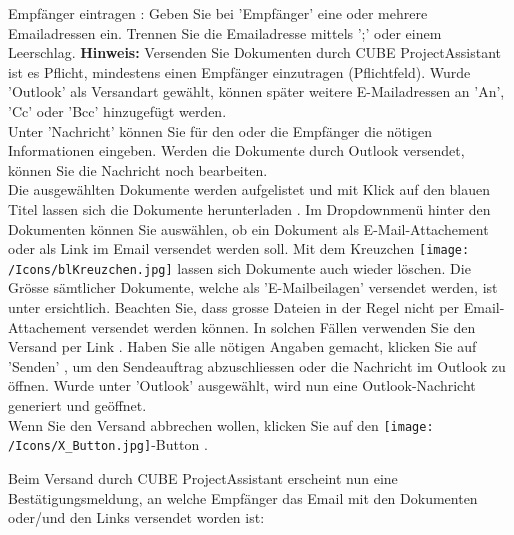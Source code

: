 Empfänger eintragen : Geben Sie bei 'Empfänger' eine oder mehrere Emailadressen ein. Trennen Sie die Emailadresse mittels ';' oder einem Leerschlag. \textbf{Hinweis:} Versenden Sie Dokumenten durch CUBE ProjectAssistant ist es Pflicht, mindestens einen Empfänger einzutragen (Pflichtfeld). Wurde 'Outlook' als Versandart gewählt, können später weitere E-Mailadressen an 'An', 'Cc' oder 'Bcc' hinzugefügt werden.\\
Unter 'Nachricht'  können Sie für den oder die Empfänger die nötigen Informationen eingeben. Werden die Dokumente durch Outlook versendet, können Sie die Nachricht noch bearbeiten.\\ 
Die ausgewählten Dokumente werden aufgelistet und mit Klick auf den blauen Titel lassen sich die Dokumente herunterladen . Im Dropdownmenü hinter den Dokumenten können Sie auswählen, ob ein Dokument als E-Mail-Attachement  oder als Link im Email  versendet werden soll. Mit dem Kreuzchen \texttt{[image: /Icons/blKreuzchen.jpg]}  lassen sich Dokumente auch wieder löschen. Die Grösse sämtlicher Dokumente, welche als 'E-Mailbeilagen' versendet werden, ist unter  ersichtlich. Beachten Sie, dass grosse Dateien in der Regel nicht per Email-Attachement versendet werden können. In solchen Fällen verwenden Sie den Versand per Link . Haben Sie alle nötigen Angaben gemacht, klicken Sie auf 'Senden' , um den Sendeauftrag abzuschliessen oder die Nachricht im Outlook zu öffnen. Wurde unter  'Outlook' ausgewählt, wird nun eine Outlook-Nachricht generiert und geöffnet.\\
Wenn Sie den Versand abbrechen wollen, klicken Sie auf den \texttt{[image: /Icons/X\_Button.jpg]}-Button .

\vspace{\baselineskip}

Beim Versand durch CUBE ProjectAssistant erscheint nun eine Bestätigungsmeldung, an welche Empfänger das Email mit den Dokumenten oder/und den Links versendet worden ist:

\begin{figure}[H]
\end{figure}

